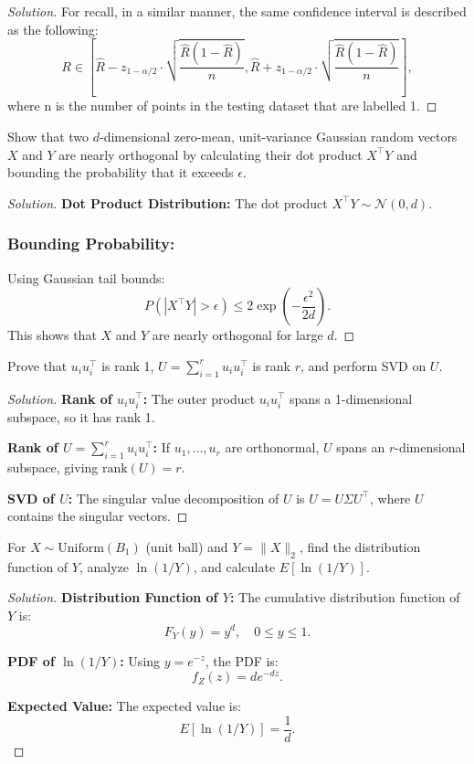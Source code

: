 \documentclass[12pt]{article}
\newenvironment{exercise}[2][Exercise]{\begin{trivlist}
\item[\hskip \labelsep {\bfseries #1}\hskip \labelsep {\bfseries #2.}]}{\end{trivlist}}
\newenvironment{solution}{\begin{proof}[Solution]}{\end{proof}}
\begin{document}
\begin{solution}
For recall, in a similar manner, the same confidence interval is described as the following:
\[
R \in \left[ \hat{R} - z_{1-\alpha/2} \cdot \sqrt{\frac{\hat{R}(1 - \hat{R})}{n}}, \hat{R} + z_{1-\alpha/2} \cdot \sqrt{\frac{\hat{R}(1 - \hat{R})}{n}} \right],
\]
where n is the number of points in the testing dataset that are labelled 1.
\end{solution}

\newpage

\begin{exercise}{3}
Show that two $d$-dimensional zero-mean, unit-variance Gaussian random vectors $X$ and $Y$ are nearly orthogonal by calculating their dot product $X^\top Y$ and bounding the probability that it exceeds $\epsilon$.
\end{exercise}

\begin{solution}
\textbf{Dot Product Distribution:} The dot product $X^\top Y \sim \mathcal{N}(0, d)$.

\subsubsection*{Bounding Probability:}
Using Gaussian tail bounds:
\[
P(|X^\top Y| > \epsilon) \leq 2 \exp\left(-\frac{\epsilon^2}{2d}\right).
\]
This shows that $X$ and $Y$ are nearly orthogonal for large $d$.
\end{solution}

\newpage

\begin{exercise}{4}
Prove that $u_i u_i^\top$ is rank 1, $U = \sum_{i=1}^r u_i u_i^\top$ is rank $r$, and perform SVD on $U$.
\end{exercise}

\begin{solution}
\textbf{Rank of $u_i u_i^\top$:}
The outer product $u_i u_i^\top$ spans a 1-dimensional subspace, so it has rank 1.

\textbf{Rank of $U = \sum_{i=1}^r u_i u_i^\top$:}
If $u_1, \dots, u_r$ are orthonormal, $U$ spans an $r$-dimensional subspace, giving $\text{rank}(U) = r$.

\textbf{SVD of $U$:}
The singular value decomposition of $U$ is $U = U \Sigma U^\top$, where $U$ contains the singular vectors.
\end{solution}

\newpage

\begin{exercise}{5}
For $X \sim \text{Uniform}(B_1)$ (unit ball) and $Y = \|X\|_2$, find the distribution function of $Y$, analyze $\ln(1/Y)$, and calculate $E[\ln(1/Y)]$.
\end{exercise}

\begin{solution}
\textbf{Distribution Function of $Y$:}
The cumulative distribution function of $Y$ is:
\[
F_Y(y) = y^d, \quad 0 \leq y \leq 1.
\]

\textbf{PDF of $\ln(1/Y)$:}
Using $y = e^{-z}$, the PDF is:
\[
f_Z(z) = d e^{-dz}.
\]

\textbf{Expected Value:}
The expected value is:
\[
E[\ln(1/Y)] = \frac{1}{d}.
\]
\end{solution}
\end{document}
